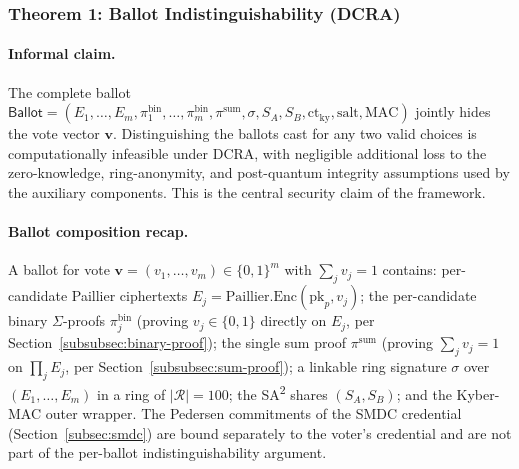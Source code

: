\subsubsection{Theorem 1: Ballot Indistinguishability (DCRA)}
\label{subsubsec:t1-ballot-privacy}

\paragraph{Informal claim.} The complete ballot $\mathsf{Ballot} = (E_1, \ldots, E_m, \pi^{\text{bin}}_1, \ldots, \pi^{\text{bin}}_m, \pi^{\text{sum}}, \sigma, S_A, S_B, \text{ct}_{\text{ky}}, \text{salt}, \text{MAC})$ jointly hides the vote vector $\mathbf{v}$. Distinguishing the ballots cast for any two valid choices is computationally infeasible under DCRA, with negligible additional loss to the zero-knowledge, ring-anonymity, and post-quantum integrity assumptions used by the auxiliary components. This is the central security claim of the framework.

\paragraph{Ballot composition recap.} A ballot for vote $\mathbf{v} = (v_1, \ldots, v_m) \in \{0,1\}^m$ with $\sum_j v_j = 1$ contains: per-candidate Paillier ciphertexts $E_j = \text{Paillier.Enc}(\text{pk}_p, v_j)$; the per-candidate binary $\Sigma$-proofs $\pi^{\text{bin}}_j$ (proving $v_j \in \{0,1\}$ directly on $E_j$, per Section~\ref{subsubsec:binary-proof}); the single sum proof $\pi^{\text{sum}}$ (proving $\sum_j v_j = 1$ on $\prod_j E_j$, per Section~\ref{subsubsec:sum-proof}); a linkable ring signature $\sigma$ over $(E_1, \ldots, E_m)$ in a ring of $|\mathcal{R}| = 100$; the SA\textsuperscript{2} shares $(S_A, S_B)$; and the Kyber-MAC outer wrapper. The Pedersen commitments of the SMDC credential (Section~\ref{subsec:smdc}) are bound separately to the voter's credential and are not part of the per-ballot indistinguishability argument.

